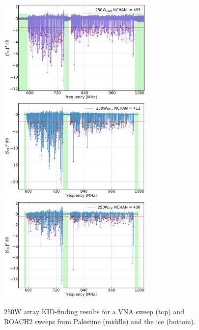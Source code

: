 
\begin{figure}[!p]
\centering
\caption[~250W array KID-finding results.]{250W array KID-finding results for a VNA sweep (top) and ROACH2 sweeps from Palestine (middle) and the ice (bottom).}
\includegraphics[width=0.68\textwidth]{figures/blast_data/sweeps/250W_May2018VNA_FK}
\includegraphics[width=0.68\textwidth]{figures/blast_data/sweeps/250W_PAL_FK}
\includegraphics[width=0.68\textwidth]{figures/blast_data/sweeps/250W_ICE_FK}
\label{fig:250W FK}
\end{figure}


